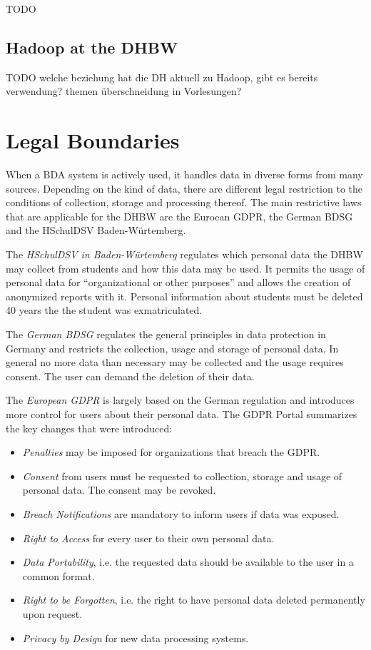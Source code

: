 TODO

\subsection{Hadoop at the DHBW}

TODO welche beziehung hat die DH aktuell zu Hadoop, gibt es bereits verwendung? themen überschneidung in Vorlesungen?

\section{Legal Boundaries}
\label{sec:fund:legal}

When a \ac{BDA} system is actively used, it handles data in diverse forms from many sources.
Depending on the kind of data, there are different legal restriction 
to the conditions of collection, storage and processing thereof.
The main restrictive laws that are applicable for the \ac{DHBW} are the Euroean \ac{GDPR}, the German \ac{BDSG} and the \ac{HSchulDSV} Baden-Würtemberg.

The \emph{\ac{HSchulDSV} in Baden-Würtemberg}  regulates which personal data the \ac{DHBW} may collect from students and how this data may be used.
It permits the usage of personal data for \enquote{organizational or other purposes} and allows the creation of anonymized reports with it.
Personal information about students must be deleted 40 years the the student was exmatriculated. 
\autocite[][§1, §11, §12]{bw2012hcchuldsv}

The \emph{German \ac{BDSG}} regulates the general principles in data protection in Germany 
and restricts the collection, usage and storage of personal data.
In general no more data than necessary may be collected and the usage requires consent. 
The user can demand the deletion of their data.
\autocite[][§1ff., §12ff.]{bmjv2009bdsg}

The \emph{European \ac{GDPR}} is largely based
on the German regulation and introduces more control for users about their personal data.
\autocite{eu2016gdpr}
The \ac{GDPR} Portal \autocite{trunomi2018gdpr} summarizes the key changes that were introduced:
\begin{itemize}
    \item \emph{Penalties} may be imposed for organizations that breach the \ac{GDPR}.
    \item \emph{Consent} from users must be requested to collection, storage and usage of personal data. The consent may be revoked.
    \item \emph{Breach Notifications} are mandatory to inform users if data was exposed.
    \item \emph{Right to Access} for every user to their own personal data.
    \item \emph{Data Portability}, i.e. the requested data should be available to the user in a common format.
    \item \emph{Right to be Forgotten}, i.e. the right to have personal data deleted permanently upon request.
    \item \emph{Privacy by Design} for new data processing systems.
\end{itemize}

